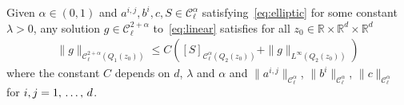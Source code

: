 \documentclass[AHL,Unicode,longabstracts,published]{cedram}
\newcommand{\R}{\mathbb{R}}
\newcommand{\cC}{\mathcal{C}}
\begin{document}
\begin{theo}\label{thm:variable-loc}
Given $\alpha \in (0,1)$ and $a^{i,j},b^i,c, S \in\cC_\ell^{\alpha}$ satisfying~\eqref{eq:elliptic} for some constant $\lambda >0$, any solution $g \in \cC_\ell^{2+\alpha}$ to~\eqref{eq:linear} satisfies for all $z_0 \in \R \times \R^d \times \R^d$
\begin{align*}
\| g\|_{\cC_\ell^{2+\alpha}\left(Q_1(z_0)\right)}
\le C \left([S]_{\cC_\ell^{\alpha}\left(Q_2(z_0)\right)} + \| g
\|_{L^\infty\left(Q_2(z_0)\right)} \right)
\end{align*}
where the constant $C$ depends on $d$, $\lambda$ and $\alpha$ and $\|a^{i,j}\|_{\cC_\ell^{\alpha}}$, $\|b^i\|_{\cC_\ell^{\alpha}}$, $\|c\|_{\cC_\ell^{\alpha}}$ for $i,j\linebreak =1,\,\dots,\,d$.
\end{theo}
\end{document}
